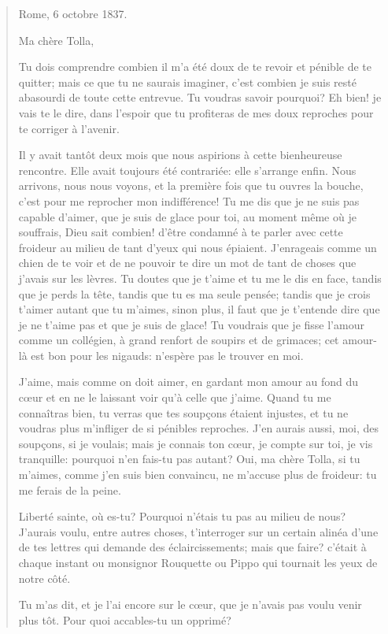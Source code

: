 \begin{quote}
Rome, 6 octobre 1837.

Ma chère Tolla,

Tu dois comprendre combien il m'a été doux de te revoir et pénible de te
quitter; mais ce que tu ne saurais imaginer, c'est combien je suis resté
abasourdi de toute cette entrevue. Tu voudras savoir pourquoi? Eh bien!
je vais te le dire, dans l'espoir que tu profiteras de mes doux
reproches pour te corriger à l'avenir.

Il y avait tantôt deux mois que nous aspirions à cette bienheureuse
rencontre. Elle avait toujours été contrariée: elle s'arrange enfin.
Nous arrivons, nous nous voyons, et la première fois que tu ouvres la
bouche, c'est pour me reprocher mon indifférence! Tu me dis que je ne
suis pas capable d'aimer, que je suis de glace pour toi, au moment même
où je souffrais, Dieu sait combien! d'être condamné à te parler avec
cette froideur au milieu de tant d'yeux qui nous épiaient. J'enrageais
comme un chien de te voir et de ne pouvoir te dire un mot de tant de
choses que j'avais sur les lèvres. Tu doutes que je t'aime et tu me le
dis en face, tandis que je perds la tête, tandis que tu es ma seule
pensée; tandis que je crois t'aimer autant que tu m'aimes, sinon plus,
il faut que je t'entende dire que je ne t'aime pas et que je suis de
glace! Tu voudrais que je fisse l'amour comme un collégien, à grand
renfort de soupirs et de grimaces; cet amour-là est bon pour les
nigauds: n'espère pas le trouver en moi.

J'aime, mais comme on doit aimer, en gardant mon amour au fond du cœur
et en ne le laissant voir qu'à celle que j'aime. Quand tu me connaîtras
bien, tu verras que tes soupçons étaient injustes, et tu ne voudras plus
m'infliger de si pénibles reproches. J'en aurais aussi, moi, des
soupçons, si je voulais; mais je connais ton cœur, je compte sur toi, je
vis tranquille: pourquoi n'en fais-tu pas autant? Oui, ma chère Tolla,
si tu m'aimes, comme j'en suis bien convaincu, ne m'accuse plus de
froideur: tu me ferais de la peine.

Liberté sainte, où es-tu? Pourquoi n'étais tu pas au milieu de nous?
J'aurais voulu, entre autres choses, t'interroger sur un certain alinéa
d'une de tes lettres qui demande des éclaircissements; mais que faire?
c'était à chaque instant ou monsignor Rouquette ou Pippo qui tournait
les yeux de notre côté.

Tu m'as dit, et je l'ai encore sur le cœur, que je n'avais pas voulu
venir plus tôt. Pour quoi accables-tu un opprimé?


\end{quote}
